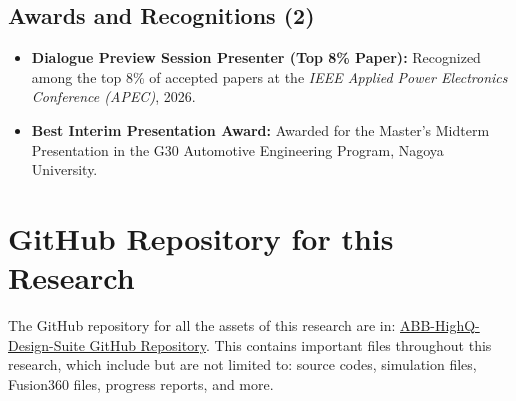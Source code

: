 \begin{singlespace}
\subsection*{Awards and Recognitions (2)}
\begin{singlespace}
\begin{itemize}
    \item \textbf{Dialogue Preview Session Presenter (Top 8\% Paper):} Recognized among the top 8\% of accepted papers at the \textit{IEEE Applied Power Electronics Conference (APEC)}, 2026.
    \item \textbf{Best Interim Presentation Award:} Awarded for the Master's Midterm Presentation in the G30 Automotive Engineering Program, Nagoya University.
\end{itemize}
\end{singlespace}
\end{singlespace}

\section*{GitHub Repository for this Research}
The GitHub repository for all the assets of this research are in: \href{https://github.com/AngKapitan/ABB-HighQ-Design-Suite}{ABB-HighQ-Design-Suite GitHub Repository}. This contains important files throughout this research, which include but are not limited to: source codes, simulation files, Fusion360 files, progress reports, and more.

